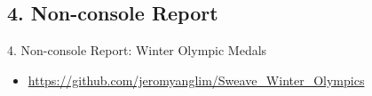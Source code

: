 \subsection{4. Non-console Report}
\begin{frame}{4. Non-console Report: Winter Olympic Medals}
\begin{itemize}
\item {\tiny \url{https://github.com/jeromyanglim/Sweave_Winter_Olympics}}
\end{itemize}
\end{frame}







